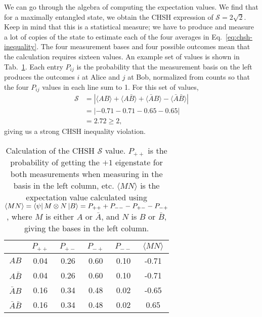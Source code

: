 We can go through the algebra of computing the expectation values.
We find that for a maximally entangled state, we obtain the CHSH expression of $\mathcal{S}=2\sqrt{2}$.
Keep in mind that this is a statistical measure; we have to produce and measure a lot of copies of the state \ket{\psi} to estimate each of the four averages in Eq.~\ref{eq:chsh-inequality}.
The four measurement bases and four possible outcomes mean that the calculation requires sixteen values.
An example set of values is shown in Tab.~\ref{tab:chsh-calculation}.  Each entry $P_{ij}$ is the probability that the measurement basis on the left produces the outcomes $i$ at Alice and $j$ at Bob, normalized from counts so that the four $P_{ij}$ values in each line sum to 1.
For this set of values,
\begin{equation}
\begin{aligned}
    \mathcal{S} &= |\langle A B\rangle+\langle A \bar{B}\rangle+\langle\bar{A} B\rangle-\langle\bar{A} \bar{B}\rangle| \\
    &= | -0.71 -0.71 - 0.65 - 0.65 | \\
    &= 2.72 \geq 2,
\end{aligned}
\label{eq:chsh-example}
\end{equation}
giving us a strong CHSH inequality violation.

\begin{table}[t]
    \setcellgapes{3pt}
    \renewcommand\theadfont{}
    \makegapedcells
    \centering
    \begin{tabular}{cccccc}
        \hline
        & \boldmath$P_{++}$ & \boldmath$P_{+-}$ & \boldmath$P_{-+}$ & \boldmath$P_{--}$ & \boldmath$\langle MN \rangle$ \\
        \hline
        \boldmath$AB$ & 0.04 & 0.26 & 0.60 & 0.10 & -0.71 \\
        \boldmath$A\bar{B}$ & 0.04 & 0.26 & 0.60 & 0.10 & -0.71 \\
        \boldmath$\bar{A}B$ & 0.16 & 0.34 & 0.48 & 0.02 & -0.65 \\
        \boldmath$\bar{A}\bar{B}$ & 0.16 & 0.34 & 0.48 & 0.02 & 0.65 \\
        \hline
    \end{tabular}
    \caption[Calculation of the $\mathcal{S}$ value.]{Calculation of the CHSH $\mathcal{S}$ value. $P_{++}$ is the probability of getting the $+1$ eigenstate for both measurements when measuring in the basis in the left column, etc. $\langle MN \rangle$ is the expectation value calculated using $\langle MN \rangle = \left\langle \psi \right| M\otimes N\left| B \right\rangle = P_{++} + P_{--} - P_{+-} - P_{-+}$, where $M$ is either $A$ or $\bar{A}$, and $N$ is $B$ or $\bar{B}$,  giving the bases in the left column.}
    \label{tab:chsh-calculation}
\end{table}


